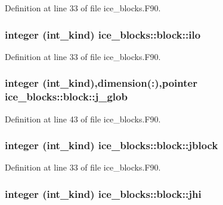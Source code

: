 Definition at line 33 of file ice\_\-blocks.F90.\hypertarget{typeice__blocks_1_1block_ae5b26aaa04f4327e685ee78e924bcc66}{
\subsubsection[{ilo}]{\setlength{\rightskip}{0pt plus 5cm}integer (int\_\-kind) {\bf ice\_\-blocks::block::ilo}}}
\label{typeice__blocks_1_1block_ae5b26aaa04f4327e685ee78e924bcc66}


Definition at line 33 of file ice\_\-blocks.F90.\hypertarget{typeice__blocks_1_1block_a831bdda5b9ae05ad0b53ef557563cb36}{
\subsubsection[{j\_\-glob}]{\setlength{\rightskip}{0pt plus 5cm}integer (int\_\-kind),dimension(:),pointer {\bf ice\_\-blocks::block::j\_\-glob}}}
\label{typeice__blocks_1_1block_a831bdda5b9ae05ad0b53ef557563cb36}


Definition at line 43 of file ice\_\-blocks.F90.\hypertarget{typeice__blocks_1_1block_ad4a24ca3161e8f30d7e14160f096f22a}{
\subsubsection[{jblock}]{\setlength{\rightskip}{0pt plus 5cm}integer (int\_\-kind) {\bf ice\_\-blocks::block::jblock}}}
\label{typeice__blocks_1_1block_ad4a24ca3161e8f30d7e14160f096f22a}


Definition at line 33 of file ice\_\-blocks.F90.\hypertarget{typeice__blocks_1_1block_ac30450237c648eabd7384ddae651903b}{
\subsubsection[{jhi}]{\setlength{\rightskip}{0pt plus 5cm}integer (int\_\-kind) {\bf ice\_\-blocks::block::jhi}}}
\label{typeice__blocks_1_1block_ac30450237c648eabd7384ddae651903b}


